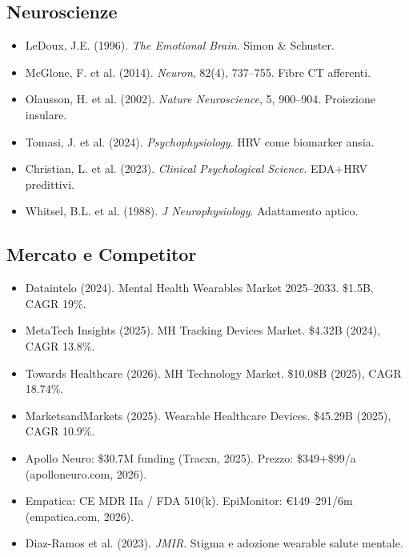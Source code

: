 \documentclass[12pt,a4paper]{article}
\begin{document}
\subsection{Neuroscienze}
\begin{itemize}
    \item LeDoux, J.E. (1996). \textit{The Emotional Brain}. Simon \& Schuster.
    \item McGlone, F. et al. (2014). \textit{Neuron}, 82(4), 737--755. Fibre CT afferenti.
    \item Olausson, H. et al. (2002). \textit{Nature Neuroscience}, 5, 900--904. Proiezione insulare.
    \item Tomasi, J. et al. (2024). \textit{Psychophysiology}. HRV come biomarker ansia.
    \item Christian, L. et al. (2023). \textit{Clinical Psychological Science}. EDA+HRV predittivi.
    \item Whitsel, B.L. et al. (1988). \textit{J Neurophysiology}. Adattamento aptico.
\end{itemize}

\subsection{Mercato e Competitor}
\begin{itemize}
    \item Dataintelo (2024). Mental Health Wearables Market 2025--2033. \$1.5B, CAGR 19\%.
    \item MetaTech Insights (2025). MH Tracking Devices Market. \$4.32B (2024), CAGR 13.8\%.
    \item Towards Healthcare (2026). MH Technology Market. \$10.08B (2025), CAGR 18.74\%.
    \item MarketsandMarkets (2025). Wearable Healthcare Devices. \$45.29B (2025), CAGR 10.9\%.
    \item Apollo Neuro: \$30.7M funding (Tracxn, 2025). Prezzo: \$349+\$99/a (apolloneuro.com, 2026).
    \item Empatica: CE MDR IIa / FDA 510(k). EpiMonitor: €149--291/6m (empatica.com, 2026).
    \item Diaz-Ramos et al. (2023). \textit{JMIR}. Stigma e adozione wearable salute mentale.
\end{itemize}
\end{document}
